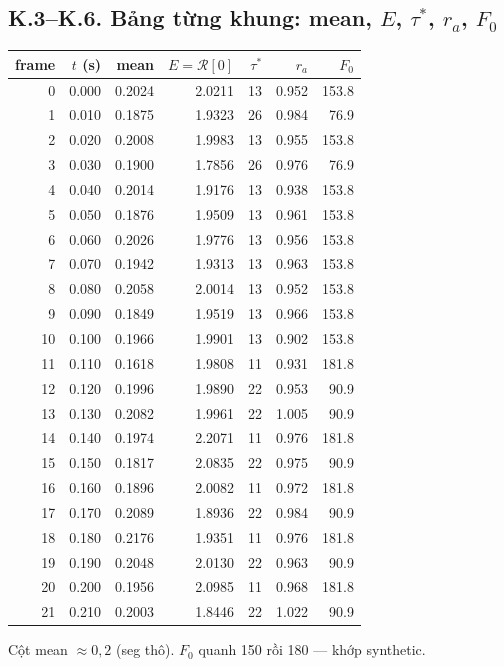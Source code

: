 \subsection*{K.3--K.6. Bảng từng khung: mean, $E$, $\tau^*$, $r_a$, $F_0$}
\begin{center}\scriptsize
\begin{tabular}{@{}rrrrrrr@{}}
\toprule
frame & $t$ (s) & mean & $E=\mathcal{R}[0]$ & $\tau^*$ & $r_a$ & $F_0$ \\
\midrule
0 & 0.000 & 0.2024 & 2.0211 & 13 & 0.952 & 153.8 \\
1 & 0.010 & 0.1875 & 1.9323 & 26 & 0.984 & 76.9 \\
2 & 0.020 & 0.2008 & 1.9983 & 13 & 0.955 & 153.8 \\
3 & 0.030 & 0.1900 & 1.7856 & 26 & 0.976 & 76.9 \\
4 & 0.040 & 0.2014 & 1.9176 & 13 & 0.938 & 153.8 \\
5 & 0.050 & 0.1876 & 1.9509 & 13 & 0.961 & 153.8 \\
6 & 0.060 & 0.2026 & 1.9776 & 13 & 0.956 & 153.8 \\
7 & 0.070 & 0.1942 & 1.9313 & 13 & 0.963 & 153.8 \\
8 & 0.080 & 0.2058 & 2.0014 & 13 & 0.952 & 153.8 \\
9 & 0.090 & 0.1849 & 1.9519 & 13 & 0.966 & 153.8 \\
10 & 0.100 & 0.1966 & 1.9901 & 13 & 0.902 & 153.8 \\
11 & 0.110 & 0.1618 & 1.9808 & 11 & 0.931 & 181.8 \\
12 & 0.120 & 0.1996 & 1.9890 & 22 & 0.953 & 90.9 \\
13 & 0.130 & 0.2082 & 1.9961 & 22 & 1.005 & 90.9 \\
14 & 0.140 & 0.1974 & 2.2071 & 11 & 0.976 & 181.8 \\
15 & 0.150 & 0.1817 & 2.0835 & 22 & 0.975 & 90.9 \\
16 & 0.160 & 0.1896 & 2.0082 & 11 & 0.972 & 181.8 \\
17 & 0.170 & 0.2089 & 1.8936 & 22 & 0.984 & 90.9 \\
18 & 0.180 & 0.2176 & 1.9351 & 11 & 0.976 & 181.8 \\
19 & 0.190 & 0.2048 & 2.0130 & 22 & 0.963 & 90.9 \\
20 & 0.200 & 0.1956 & 2.0985 & 11 & 0.968 & 181.8 \\
21 & 0.210 & 0.2003 & 1.8446 & 22 & 1.022 & 90.9 \\
\bottomrule
\end{tabular}
\end{center}
Cột mean $\approx0{,}2$ (seg thô). $F_0$ quanh 150 rồi 180 --- khớp synthetic.
